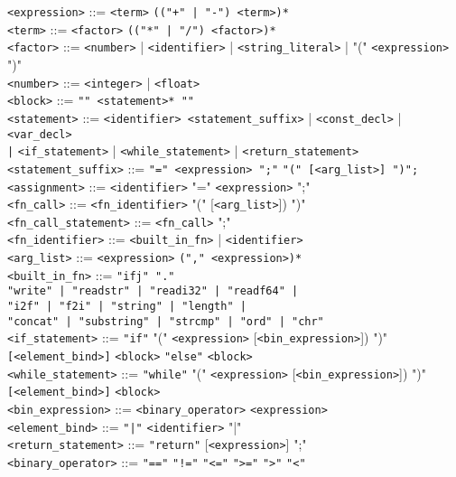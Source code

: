 \documentclass[12pt,a4paper]{article}
\begin{document}
\begin{tabbing}
\> \texttt{<expression>} \> ::= \> \texttt{<term>} \texttt{(("+" | "-") <term>)*} \\
\> \texttt{<term>} \> ::= \> \texttt{<factor>} \texttt{(("*" | "/") <factor>)*} \\
\> \texttt{<factor>} \> ::= \> \texttt{<number>} | \texttt{<identifier>} | \texttt{<string\_literal>} | "(" \texttt{<expression>} ")" \\
\> \texttt{<number>} \> ::= \> \texttt{<integer>} | \texttt{<float>} \\
\> \texttt{<block>} \> ::= \> \texttt{"{" <statement>* "}"} \\
\> \texttt{<statement>} \> ::= \> \texttt{<identifier> <statement\_suffix>} | \texttt{<const\_decl>} | \texttt{<var\_decl>} \\
\> \> \texttt{|} \texttt{<if\_statement>} | \texttt{<while\_statement>} | \texttt{<return\_statement>} \\
\> \texttt{<statement\_suffix>} \> ::= \> \texttt{"=" <expression> ";"} \mid \texttt{"(" [<arg\_list>] ")";} \\
\> \texttt{<assignment>} \> ::= \> \texttt{<identifier>} "=" \texttt{<expression>} ";" \\
\> \texttt{<fn\_call>} \> ::= \> \texttt{<fn\_identifier>} "(" [\texttt{<arg\_list>}]) ")" \\
\> \texttt{<fn\_call\_statement>} \> ::= \> \texttt{<fn\_call>} ";" \\
\> \texttt{<fn\_identifier>} \> ::= \> \texttt{<built\_in\_fn>} | \texttt{<identifier>} \\
\> \texttt{<arg\_list>} \> ::= \> \texttt{<expression>} \texttt{("," <expression>)*} \\
\> \texttt{<built\_in\_fn>} \> ::= \> \texttt{"ifj" "."} \\
\> \> \texttt{"write" | "readstr" | "readi32" | "readf64" |} \\
\> \> \texttt{"i2f" | "f2i" | "string" | "length" |} \\
\> \> \texttt{"concat" | "substring" | "strcmp" | "ord" | "chr"} \\
\> \texttt{<if\_statement>} \> ::= \> \texttt{"if"} "(" \texttt{<expression>} [\texttt{<bin\_expression>}]) ")" \\
\> \> \texttt{[<element\_bind>]} \texttt{<block>} \texttt{"else"} \texttt{<block>} \\
\> \texttt{<while\_statement>} \> ::= \> \texttt{"while"} "(" \texttt{<expression>} [\texttt{<bin\_expression>}]) ")" \\
\> \> \texttt{[<element\_bind>]} \texttt{<block>} \\
\> \texttt{<bin\_expression>} \> ::= \> \texttt{<binary\_operator>} \texttt{<expression>} \\
\> \texttt{<element\_bind>} \> ::= \> \texttt{"|"} \texttt{<identifier>} "|" \\
\> \texttt{<return\_statement>} \> ::= \> \texttt{"return"} [\texttt{<expression>}] ";" \\
\> \texttt{<binary\_operator>} \> ::= \> \texttt{"=="} \mid \texttt{"!="} \mid \texttt{"<="} \mid \texttt{">="} \mid \texttt{">"} \mid \texttt{"<"}
\end{tabbing}
\end{document}
